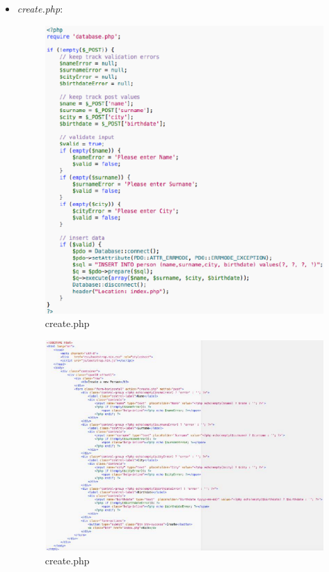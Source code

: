 \begin{itemize}

\item{\textit{create.php}}:

\begin{center}
\begin{figure}[H]
\centering
\includegraphics[scale=1]{figures/createphp.png}
\caption{create.php} 
\end{figure}
\end{center}

\begin{center}
\begin{figure}[H]
\centering
\includegraphics[scale=0.8]{figures/createphp2.png}
\caption{create.php} 
\end{figure}
\end{center}


\end{itemize}
